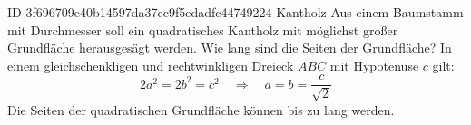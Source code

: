 \begin{exercise}
      {ID-3f696709e40b14597da37cc9f5edadfc44749224}
      {Kantholz}
  \ifproblem\problem
    Aus einem Baumstamm mit  Durchmesser soll ein quadratisches Kantholz
    mit möglichst großer Grundfläche herausgesägt werden. Wie lang sind die
    Seiten der Grundfläche?
  \fi
  \ifoutline\outline
    In einem gleichschenkligen und rechtwinkligen Dreieck $ABC$ mit
    Hypotenuse $c$ gilt:
    \begin{equation*}
      2a^2=2b^2=c^2
      \quad\Rightarrow\quad
      a=b=\frac{c}{\sqrt{2}}
    \end{equation*}
  \fi
  \ifoutcome\outcome
    Die Seiten der quadratischen Grundfläche können bis zu
     lang werden.
  \fi
\end{exercise}
